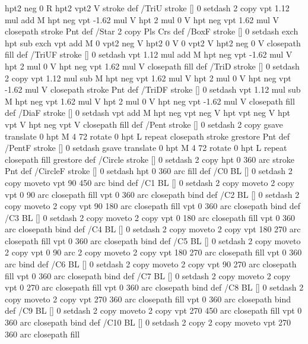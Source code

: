 {{{  hpt2 neg 0 R hpt2 vpt2 V stroke } def
/TriU { stroke [] 0 setdash 2 copy vpt 1.12 mul add M
  hpt neg vpt -1.62 mul V
  hpt 2 mul 0 V
  hpt neg vpt 1.62 mul V closepath stroke
  Pnt  } def
/Star { 2 copy Pls Crs } def
/BoxF { stroke [] 0 setdash exch hpt sub exch vpt add M
  0 vpt2 neg V  hpt2 0 V  0 vpt2 V
  hpt2 neg 0 V  closepath fill } def
/TriUF { stroke [] 0 setdash vpt 1.12 mul add M
  hpt neg vpt -1.62 mul V
  hpt 2 mul 0 V
  hpt neg vpt 1.62 mul V closepath fill } def
/TriD { stroke [] 0 setdash 2 copy vpt 1.12 mul sub M
  hpt neg vpt 1.62 mul V
  hpt 2 mul 0 V
  hpt neg vpt -1.62 mul V closepath stroke
  Pnt  } def
/TriDF { stroke [] 0 setdash vpt 1.12 mul sub M
  hpt neg vpt 1.62 mul V
  hpt 2 mul 0 V
  hpt neg vpt -1.62 mul V closepath fill} def
/DiaF { stroke [] 0 setdash vpt add M
  hpt neg vpt neg V hpt vpt neg V
  hpt vpt V hpt neg vpt V closepath fill } def
/Pent { stroke [] 0 setdash 2 copy gsave
  translate 0 hpt M 4 {72 rotate 0 hpt L} repeat
  closepath stroke grestore Pnt } def
/PentF { stroke [] 0 setdash gsave
  translate 0 hpt M 4 {72 rotate 0 hpt L} repeat
  closepath fill grestore } def
/Circle { stroke [] 0 setdash 2 copy
  hpt 0 360 arc stroke Pnt } def
/CircleF { stroke [] 0 setdash hpt 0 360 arc fill } def
/C0 { BL [] 0 setdash 2 copy moveto vpt 90 450  arc } bind def
/C1 { BL [] 0 setdash 2 copy        moveto
       2 copy  vpt 0 90 arc closepath fill
               vpt 0 360 arc closepath } bind def
/C2 { BL [] 0 setdash 2 copy moveto
       2 copy  vpt 90 180 arc closepath fill
               vpt 0 360 arc closepath } bind def
/C3 { BL [] 0 setdash 2 copy moveto
       2 copy  vpt 0 180 arc closepath fill
               vpt 0 360 arc closepath } bind def
/C4 { BL [] 0 setdash 2 copy moveto
       2 copy  vpt 180 270 arc closepath fill
               vpt 0 360 arc closepath } bind def
/C5 { BL [] 0 setdash 2 copy moveto
       2 copy  vpt 0 90 arc
       2 copy moveto
       2 copy  vpt 180 270 arc closepath fill
               vpt 0 360 arc } bind def
/C6 { BL [] 0 setdash 2 copy moveto
      2 copy  vpt 90 270 arc closepath fill
              vpt 0 360 arc closepath } bind def
/C7 { BL [] 0 setdash 2 copy moveto
      2 copy  vpt 0 270 arc closepath fill
              vpt 0 360 arc closepath } bind def
/C8 { BL [] 0 setdash 2 copy moveto
      2 copy vpt 270 360 arc closepath fill
              vpt 0 360 arc closepath } bind def
/C9 { BL [] 0 setdash 2 copy moveto
      2 copy  vpt 270 450 arc closepath fill
              vpt 0 360 arc closepath } bind def
/C10 { BL [] 0 setdash 2 copy 2 copy moveto vpt 270 360 arc closepath fill
}}}
